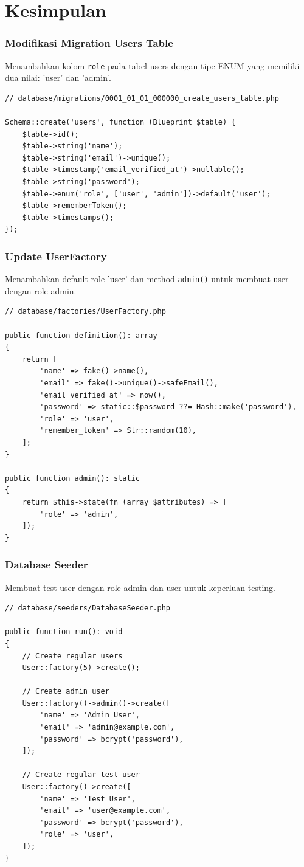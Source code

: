 \documentclass[a4paper,oneside,11pt]{book}
\begin{document}
\chapter{Kesimpulan}

\subsection{Modifikasi Migration Users Table}
Menambahkan kolom \texttt{role} pada tabel users dengan tipe ENUM yang memiliki dua nilai: 'user' dan 'admin'.

\begin{lstlisting}[style=phpstyle]
// database/migrations/0001_01_01_000000_create_users_table.php

Schema::create('users', function (Blueprint $table) {
    $table->id();
    $table->string('name');
    $table->string('email')->unique();
    $table->timestamp('email_verified_at')->nullable();
    $table->string('password');
    $table->enum('role', ['user', 'admin'])->default('user');
    $table->rememberToken();
    $table->timestamps();
});
\end{lstlisting}

\subsection{Update UserFactory}
Menambahkan default role 'user' dan method \texttt{admin()} untuk membuat user dengan role admin.

\begin{lstlisting}[style=phpstyle]
// database/factories/UserFactory.php

public function definition(): array
{
    return [
        'name' => fake()->name(),
        'email' => fake()->unique()->safeEmail(),
        'email_verified_at' => now(),
        'password' => static::$password ??= Hash::make('password'),
        'role' => 'user',
        'remember_token' => Str::random(10),
    ];
}

public function admin(): static
{
    return $this->state(fn (array $attributes) => [
        'role' => 'admin',
    ]);
}
\end{lstlisting}

\subsection{Database Seeder}
Membuat test user dengan role admin dan user untuk keperluan testing.

\begin{lstlisting}[style=phpstyle]
// database/seeders/DatabaseSeeder.php

public function run(): void
{
    // Create regular users
    User::factory(5)->create();

    // Create admin user
    User::factory()->admin()->create([
        'name' => 'Admin User',
        'email' => 'admin@example.com',
        'password' => bcrypt('password'),
    ]);

    // Create regular test user
    User::factory()->create([
        'name' => 'Test User',
        'email' => 'user@example.com',
        'password' => bcrypt('password'),
        'role' => 'user',
    ]);
}
\end{lstlisting}
\end{document}
